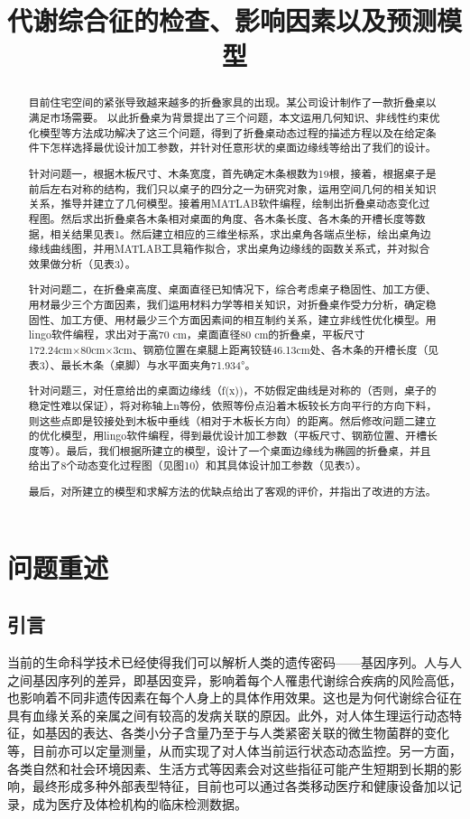 \documentclass[bwprint]{cumcmthesis}
\title{代谢综合征的检查、影响因素以及预测模型}
\begin{document}
 \maketitle
 \begin{abstract}
 目前住宅空间的紧张导致越来越多的折叠家具的出现。某公司设计制作了一款折叠桌以满足市场需要。
 以此折叠桌为背景提出了三个问题，本文运用几何知识、非线性约束优化模型等方法成功解决了这三个问题，得到了折叠桌动态过程的描述方程以及在给定条件下怎样选择最优设计加工参数，并针对任意形状的桌面边缘线等给出了我们的设计。

针对问题一，根据木板尺寸、木条宽度，首先确定木条根数为19根，接着，根据桌子是前后左右对称的结构，我们只以桌子的四分之一为研究对象，运用空间几何的相关知识关系，推导并建立了几何模型。接着用MATLAB软件编程，绘制出折叠桌动态变化过程图。然后求出折叠桌各木条相对桌面的角度、各木条长度、各木条的开槽长度等数据，相关结果见表1。然后建立相应的三维坐标系，求出桌角各端点坐标，绘出桌角边缘线曲线图，并用MATLAB工具箱作拟合，求出桌角边缘线的函数关系式，并对拟合效果做分析（见表3）。

针对问题二，在折叠桌高度、桌面直径已知情况下，综合考虑桌子稳固性、加工方便、用材最少三个方面因素，我们运用材料力学等相关知识，对折叠桌作受力分析，确定稳固性、加工方便、用材最少三个方面因素间的相互制约关系，建立非线性优化模型。用lingo软件编程，求出对于高70 cm，桌面直径80 cm的折叠桌，平板尺寸172.24cm×80cm×3cm、钢筋位置在桌腿上距离铰链46.13cm处、各木条的开槽长度（见表3）、最长木条（桌脚）与水平面夹角71.934°。

针对问题三，对任意给出的桌面边缘线（f(x))，不妨假定曲线是对称的（否则，桌子的稳定性难以保证），将对称轴上n等份，依照等份点沿着木板较长方向平行的方向下料，则这些点即是铰接处到木板中垂线（相对于木板长方向）的距离。然后修改问题二建立的优化模型，用lingo软件编程，得到最优设计加工参数（平板尺寸、钢筋位置、开槽长度等）。最后，我们根据所建立的模型，设计了一个桌面边缘线为椭圆的折叠桌，并且给出了8个动态变化过程图（见图10）和其具体设计加工参数（见表5）。

最后，对所建立的模型和求解方法的优缺点给出了客观的评价，并指出了改进的方法。

\end{abstract}

\section{问题重述}
\subsection{引言}
当前的生命科学技术已经使得我们可以解析人类的遗传密码——基因序列。人与人之间基因序列的差异，即基因变异，影响着每个人罹患代谢综合疾病的风险高低，也影响着不同非遗传因素在每个人身上的具体作用效果。这也是为何代谢综合征在具有血缘关系的亲属之间有较高的发病关联的原因。此外，对人体生理运行动态特征，如基因的表达、各类小分子含量乃至于与人类紧密关联的微生物菌群的变化等，目前亦可以定量测量，从而实现了对人体当前运行状态动态监控。另一方面，各类自然和社会环境因素、生活方式等因素会对这些指征可能产生短期到长期的影响，最终形成多种外部表型特征，目前也可以通过各类移动医疗和健康设备加以记录，成为医疗及体检机构的临床检测数据。
\end{document}
